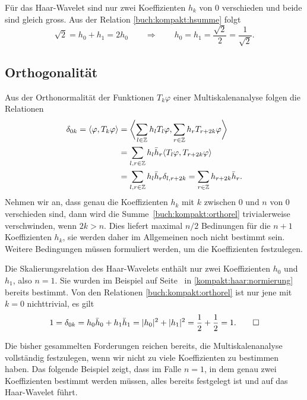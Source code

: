 \begin{beispiel}
Für das Haar-Wavelet sind nur zwei Koeffizienten $h_k$ von $0$ verschieden
und beide sind gleich gross.
Aus der Relation \eqref{buch:kompakt:hsumme} folgt
\begin{equation}
\sqrt{2}
=
h_0+h_1
=2h_0
\qquad\Rightarrow\qquad
h_0 = h_1 = \frac{\sqrt{2}}{2}=\frac{1}{\sqrt{2}}.
\label{kompakt:haar:normierung}
\end{equation}
\qedhere
\end{beispiel}

\subsection{Orthogonalität}
Aus der Orthonormalität der Funktionen $T_k\varphi$ einer Multiskalenanalyse
folgen die Relationen
\begin{align}
\delta_{0k}
=
\langle \varphi,T_k \varphi\rangle
&=
\biggl\langle
\sum_{l\in\mathbb Z} h_lT_l\varphi,
\sum_{r\in\mathbb Z} h_rT_{r+2k}\varphi
\biggr\rangle
\notag
\\
&=
\sum_{l,r\in\mathbb Z} h_l\bar{h}_r \langle T_l\varphi, T_{r+2k}\varphi\rangle
\\
&=
\sum_{l,r\in\mathbb Z} h_l\bar{h}_r \delta_{l,r+2k}
=
\sum_{r\in\mathbb Z} h_{r+2k}\bar{h}_r.
\label{buch:kompakt:orthorel}
\end{align}
Nehmen wir an, dass genau die Koeffizienten $h_k$ mit $k$ zwischen
$0$ und $n$ von $0$ verschieden sind,
dann wird die Summe~\eqref{buch:kompakt:orthorel} trivialerweise
verschwinden, wenn $2k>n$.
Dies liefert maximal $n/2$ Bedinungen für die $n+1$ Koeffizienten
$h_k$, sie werden daher im Allgemeinen noch nicht bestimmt sein.
Weitere Bedingungen müssen formuliert werden, um die Koeffizienten
festzulegen.

\begin{beispiel}
Die Skalierungsrelation des Haar-Wavelets enthält nur zwei Koeffizienten
$h_0$ und $h_1$, also $n=1$.
Sie wurden im Beispiel auf Seite~\pageref{kompakt:haar:normierung}
in \eqref{kompakt:haar:normierung} bereits bestimmt.
Von den Relationen \eqref{buch:kompakt:orthorel} ist nur jene mit $k=0$
nichttrivial, es gilt
\[
1
=
\delta_{0k}
=
h_0\bar{h}_0 + h_1\bar{h}_1
=
|h_0|^2+|h_1|^2
=
\frac12+\frac12
=1.
\qedhere
\]
\end{beispiel}

Die bisher gesammelten Forderungen reichen bereits, die Multiskalenanalyse
vollständig festzulegen, wenn wir nicht zu viele Koeffizienten zu
bestimmen haben.
Das folgende Beispiel zeigt, dass im Falle $n=1$, in dem genau zwei 
Koeffizienten bestimmt werden müssen, alles bereits festgelegt ist
und auf das Haar-Wavelet führt.

